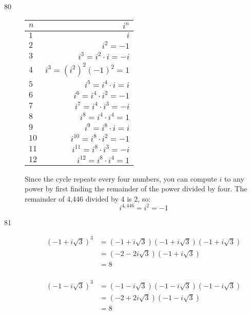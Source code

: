 \documentclass{exam}
\begin{document}
\ifprintanswers
  \begin{description}
    \item[80]
      \begin{tabular}{lr}
        \toprule
        $n$         & $i^n$ \\
        \midrule
        $1$ & $i$ \\
        $2$ & $i^2 = -1$ \\
        $3$ & $i^3 = i^2 \cdot i = -i$ \\
        $4$ & $i^3 = (i^2)^2 (-1)^2 = 1$ \\
        \midrule
        $5$ & $i^5 = i^4 \cdot i   = i$ \\
        $6$ & $i^6 = i^4 \cdot i^2 = -1$ \\
        $7$ & $i^7 = i^4 \cdot i^3 = -i$ \\
        $8$ & $i^8 = i^4 \cdot i^4 = 1$ \\
        \midrule
        $9$  & $i^9    = i^8 \cdot i   = i$ \\
        $10$ & $i^{10} = i^8 \cdot i^2 = -1$ \\
        $11$ & $i^{11} = i^8 \cdot i^3 = -i$ \\
        $12$ & $i^{12} = i^8 \cdot i^4 = 1$ \\
        \bottomrule
      \end{tabular}

      Since the cycle repeats every four numbers, you can compute $i$ to any power by first finding the remainder of the
      power divided by four.  The remainder of 4,446 divided by 4 is 2, so:
      \[
        i^{4,446} = i^2 = \boxed{-1}
      \]
      
    \item[81]
      \begin{align*}
        (-1 + i \sqrt{3})^3 &= (-1 + i \sqrt{3})(-1 + i \sqrt{3})(-1 + i \sqrt{3}) \\
                           &= (-2 -2 i \sqrt{3})(-1 + i \sqrt{3}) \\
                           &= 8 \\
      \end{align*}

      \begin{align*}
        (-1 - i \sqrt{3})^3 &= (-1 - i \sqrt{3})(-1 - i \sqrt{3})(-1 - i \sqrt{3}) \\
                           &= (-2 + 2 i \sqrt{3})(-1 - i \sqrt{3}) \\
                           &= 8 \\
      \end{align*}


\end{description}
\end{document}

